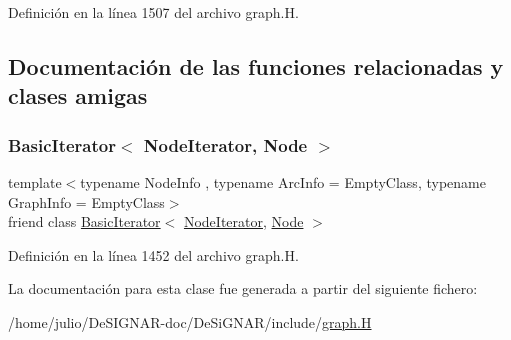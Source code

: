 Definición en la línea 1507 del archivo graph.\+H.



\subsection{Documentación de las funciones relacionadas y clases amigas}
\mbox{\label{class_designar_1_1_graph_1_1_node_iterator_a21dc6ae614d097ff896e9e8e422d8f3c}} 
\subsubsection{\texorpdfstring{Basic\+Iterator$<$ Node\+Iterator, Node $>$}{BasicIterator< NodeIterator, Node >}}
{\footnotesize\ttfamily template$<$typename Node\+Info , typename Arc\+Info  = Empty\+Class, typename Graph\+Info  = Empty\+Class$>$ \\
friend class \hyperlink{class_designar_1_1_basic_iterator}{Basic\+Iterator}$<$ \hyperlink{class_designar_1_1_graph_1_1_node_iterator}{Node\+Iterator}, \hyperlink{class_designar_1_1_graph_a5dfc7dba9d092ac489c72e40390c37d0}{Node} $>$\hspace{0.3cm}{\ttfamily [friend]}}



Definición en la línea 1452 del archivo graph.\+H.



La documentación para esta clase fue generada a partir del siguiente fichero\+:\begin{DoxyCompactItemize}
\item 
/home/julio/\+De\+S\+I\+G\+N\+A\+R-\/doc/\+De\+Si\+G\+N\+A\+R/include/\hyperlink{graph_8_h}{graph.\+H}\end{DoxyCompactItemize}
